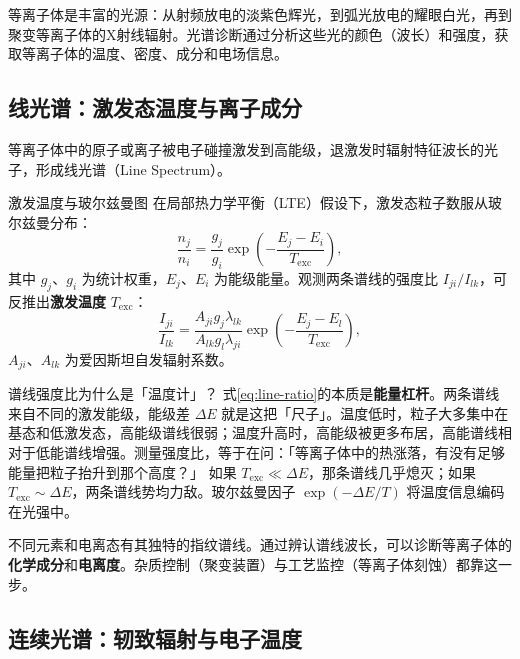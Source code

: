 \documentclass[12pt,a4paper,openany,oneside]{book}
\begin{document}
等离子体是丰富的光源：从射频放电的淡紫色辉光，到弧光放电的耀眼白光，再到聚变等离子体的X射线辐射。光谱诊断通过分析这些光的颜色（波长）和强度，获取等离子体的温度、密度、成分和电场信息。

\subsection{线光谱：激发态温度与离子成分}

等离子体中的原子或离子被电子碰撞激发到高能级，退激发时辐射特征波长的光子，形成线光谱（Line Spectrum）。

\begin{definition}{激发温度与玻尔兹曼图}{}{}
在局部热力学平衡（LTE）假设下，激发态粒子数服从玻尔兹曼分布：
\begin{equation}
\frac{n_j}{n_i} = \frac{g_j}{g_i}\exp\!\left(-\frac{E_j - E_i}{T_{\mathrm{exc}}}\right),
\label{eq:boltzmann-excitation}
\end{equation}
其中 $g_j$、$g_i$ 为统计权重，$E_j$、$E_i$ 为能级能量。观测两条谱线的强度比 $I_{ji}/I_{lk}$，可反推出\textbf{激发温度} $T_{\mathrm{exc}}$：
\begin{equation}
\frac{I_{ji}}{I_{lk}} = \frac{A_{ji} g_j \lambda_{lk}}{A_{lk} g_l \lambda_{ji}} \exp\!\left(-\frac{E_j - E_l}{T_{\mathrm{exc}}}\right),
\label{eq:line-ratio}
\end{equation}
$A_{ji}$、$A_{lk}$ 为爱因斯坦自发辐射系数。
\end{definition}

\begin{insight}{谱线强度比为什么是「温度计」？}{}
式\eqref{eq:line-ratio}的本质是\textbf{能量杠杆}。两条谱线来自不同的激发能级，能级差 $\Delta E$ 就是这把「尺子」。温度低时，粒子大多集中在基态和低激发态，高能级谱线很弱；温度升高时，高能级被更多布居，高能谱线相对于低能谱线增强。测量强度比，等于在问：「等离子体中的热涨落，有没有足够能量把粒子抬升到那个高度？」 如果 $T_{\mathrm{exc}} \ll \Delta E$，那条谱线几乎熄灭；如果 $T_{\mathrm{exc}} \sim \Delta E$，两条谱线势均力敌。玻尔兹曼因子 $\exp(-\Delta E/T)$ 将温度信息编码在光强中。
\end{insight}

不同元素和电离态有其独特的指纹谱线。通过辨认谱线波长，可以诊断等离子体的\textbf{化学成分}和\textbf{电离度}。杂质控制（聚变装置）与工艺监控（等离子体刻蚀）都靠这一步。

\subsection{连续光谱：轫致辐射与电子温度}
\end{document}

